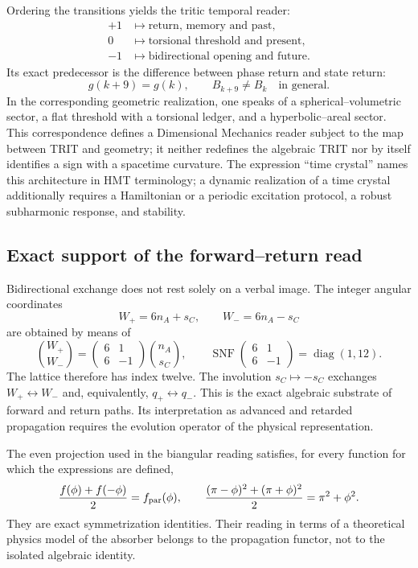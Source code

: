 Ordering the transitions yields the tritic temporal reader:
\[
 \begin{aligned}
 +1&\longmapsto\text{return, memory and past},\\
  0&\longmapsto\text{torsional threshold and present},\\
 -1&\longmapsto\text{bidirectional opening and future}.
 \end{aligned}
\]
Its exact predecessor is the difference between phase return and state return:
\[
 g(k+9)=g(k),
 \qquad B_{k+9}\neq B_k\quad\text{in general}.
\]
In the corresponding geometric realization, one speaks of a spherical--volumetric sector, a flat threshold with a torsional ledger, and a hyperbolic--areal sector. This correspondence defines a Dimensional Mechanics reader subject to the map between TRIT and geometry; it neither redefines the algebraic TRIT nor by itself identifies a sign with a spacetime curvature. The expression ``time crystal'' names this architecture in HMT terminology; a dynamic realization of a time crystal additionally requires a Hamiltonian or a periodic excitation protocol, a robust subharmonic response, and stability.

\subsection{Exact support of the forward--return read}

Bidirectional exchange does not rest solely on a verbal image. The
integer angular coordinates
\[
 W_+=6n_A+s_C,
 \qquad W_-=6n_A-s_C
\]
are obtained by means of
\[
 \binom{W_+}{W_-}
 =\begin{pmatrix}6&1\\6&-1\end{pmatrix}
 \binom{n_A}{s_C},
 \qquad
 \operatorname{SNF}\!\begin{pmatrix}6&1\\6&-1\end{pmatrix}
 =\operatorname{diag}(1,12).
\]
The lattice therefore has index twelve. The involution
\(s_C\mapsto-s_C\) exchanges \(W_+\leftrightarrow W_-\) and, equivalently,
\(q_+\leftrightarrow q_-\). This is the exact algebraic substrate
of forward and return paths. Its interpretation as advanced and retarded propagation
requires the evolution operator of the physical representation.

The even projection used in the biangular reading satisfies, for every
function for which the expressions are defined,
\[
 \frac{f(\phi)+f(-\phi)}2=f_{\rm par}(\phi),
 \qquad
 \frac{(\pi-\phi)^2+(\pi+\phi)^2}{2}=\pi^2+\phi^2.
\]
They are exact symmetrization identities. Their reading in terms of a
theoretical physics model of the absorber belongs to the propagation functor, not to the
isolated algebraic identity.

